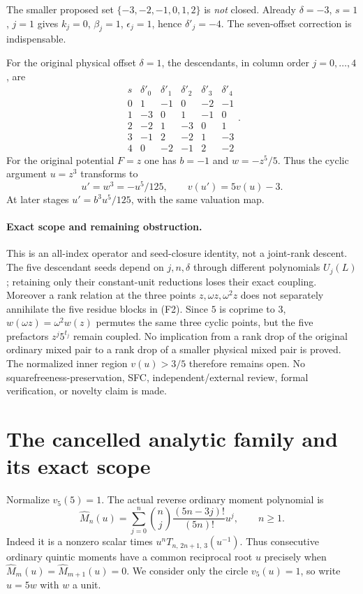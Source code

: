 \documentclass[11pt]{article}
\begin{document}
The smaller proposed set $\{-3,-2,-1,0,1,2\}$ is \emph{not}
closed.  Already $\delta=-3$, $s=1$, $j=1$ gives
$k_j=0$, $\beta_j=1$, $\epsilon_j=1$, hence $\delta'_j=-4$.
The seven-offset correction is indispensable.

For the original physical offset $\delta=1$, the descendants,
in column order $j=0,\ldots,4$, are
\[
\begin{array}{c|rrrrr}
s&\delta'_0&\delta'_1&\delta'_2&\delta'_3&\delta'_4\\\hline
0&1&-1&0&-2&-1\\
1&-3&0&1&-1&0\\
2&-2&1&-3&0&1\\
3&-1&2&-2&1&-3\\
4&0&-2&-1&2&-2
\end{array}.
\]
For the original potential $F=z$ one has $b=-1$ and
$w=-z^5/5$.  Thus the cyclic argument $u=z^3$ transforms to
\[
 u'=w^3=-u^5/125,\qquad v(u')=5v(u)-3.                            \tag{F3}
\]
At later stages $u'=b^3u^5/125$, with the same valuation map.

\paragraph{Exact scope and remaining obstruction.}
This is an all-index operator and seed-closure identity, not a
joint-rank descent.  The five descendant seeds depend on $j,n,\delta$
through different polynomials $U_j(L)$; retaining only their
constant-unit reductions loses their exact coupling.
Moreover a rank relation at the three points
$z,\omega z,\omega^2z$ does not separately annihilate the five
residue blocks in (F2).  Since $5$ is coprime to $3$,
$w(\omega z)=\omega^2w(z)$ permutes the same three cyclic points,
but the five prefactors $z^j5^{t_j}$ remain coupled.
No implication from a rank drop of the original ordinary mixed
pair to a rank drop of a smaller physical mixed pair is proved.
The normalized inner region $v(u)>3/5$ therefore remains open.
No squarefreeness-preservation, SFC, independent/external review,
formal verification, or novelty claim is made.


\section{The cancelled analytic family and its exact scope}
Normalize $v_5(5)=1$.  The actual reverse ordinary moment polynomial is
\[
 \widehat M_n(u)=
 \sum_{j=0}^{n}\binom nj\frac{(5n-3j)!}{(5n)!}u^j,\qquad n\ge1.       \tag{I1}
\]
Indeed it is a nonzero scalar times
$u^n T_{n,\,2n+1,\,3}(u^{-1})$.
Thus consecutive ordinary quintic moments have a common reciprocal
root $u$ precisely when $\widehat M_m(u)=\widehat M_{m+1}(u)=0$.
We consider only the circle $v_5(u)=1$, so write $u=5w$ with $w$ a unit.
\end{document}
